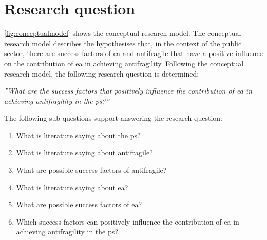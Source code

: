\section{Research question}
\cref{fig:conceptualmodel} shows the conceptual research model. The conceptual research model describes the hypothesises that, in the context of the public sector, there are success factors of \acrshort{ea} and \gls{antifragile} that have a positive influence on the contribution of \acrlong{ea} in achieving \gls{antifragility}. Following the conceptual research model, the following research question is determined:\bigskip

\noindent \emph{''What are the success factors that positively influence the contribution of \acrlong{ea} in achieving \gls{antifragility} in the \gls{ps}?''}\bigskip

\noindent The following sub-questions support answering the research question:

\begin{enumerate}
	\item{What is literature saying about the \gls{ps}?}
	\item{What is literature saying about \gls{antifragile}?}
	\item{What are possible success factors of \gls{antifragile}?}
	\item{What is literature saying about \acrlong{ea}?}
	\item{What are possible success factors of \acrlong{ea}?}
	\item{Which success factors can positively influence the contribution of \acrlong{ea} in achieving \gls{antifragility} in the \gls{ps}?}
\end{enumerate}
